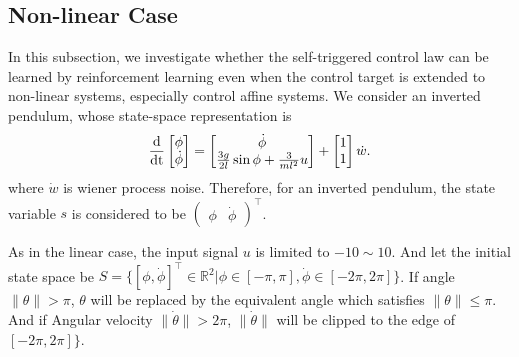 \documentclass[english, dvipdfmx]{ampmt}             %
\newcommand{\odif}[2]{\frac{\rm{d}#1}{\rm{d}#2}}
\begin{document}
\subsection{Non-linear Case}
In this subsection, we investigate whether the self-triggered control law can be learned by reinforcement learning even when the control target is extended to non-linear systems, especially control affine systems. We consider an inverted pendulum, whose state-space representation is
\begin{equation}
	\odif{}{t}\begin{bmatrix}\phi \\ \dot{\phi}\end{bmatrix} = 
		\begin{bmatrix}\dot{\phi} \\ \frac{3g}{2l}\sin{\phi} + \frac{3}{ml^2}u \end{bmatrix} + \begin{bmatrix}1 \\ 1\end{bmatrix}\dot{w}\label{pendulum}.
\end{equation}
where $\dot{w}$ is wiener process noise. Therefore, for an inverted pendulum, the state variable $s$ is considered to be $\begin{pmatrix}\phi & \dot{\phi}\end{pmatrix}^{\top}$.
\par
As in the linear case, the input signal $u$ is limited to $-10 \sim 10$. And let the initial state space be $S = \{[\phi, \dot{\phi}]^{\top}\in \mathbb{R}^2| \phi\in[-\pi,\pi], \dot{\phi}\in[-2\pi,2\pi]\}$. 
If angle $\|\theta\| > \pi$, $\theta$ will be replaced by the equivalent angle which satisfies $\|\theta\| \leq \pi$. And if Angular velocity $\|\dot{\theta}\| > 2\pi$, $\|\dot{\theta}\|$ will be clipped to the edge of $[-2\pi,2\pi]\}$.
\fi
\end{document}
